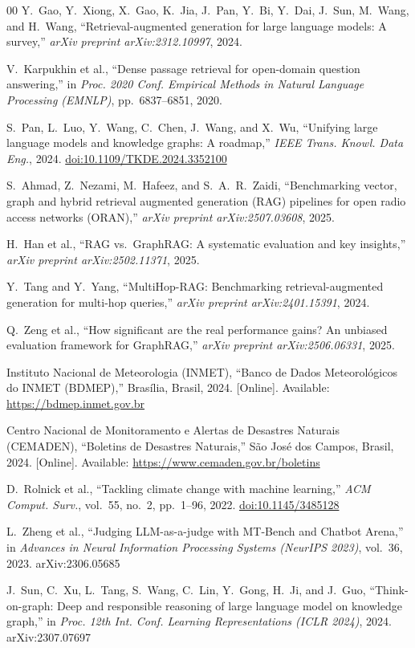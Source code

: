 \documentclass[conference]{IEEEtran}
\begin{document}
\begin{thebibliography}{00}
Y.~Gao, Y.~Xiong, X.~Gao, K.~Jia, J.~Pan, Y.~Bi, Y.~Dai,
J.~Sun, M.~Wang, and H.~Wang,
``Retrieval-augmented generation for large language models:
A survey,''
\textit{arXiv preprint arXiv:2312.10997}, 2024.

V.~Karpukhin et al.,
``Dense passage retrieval for open-domain question answering,''
in \textit{Proc. 2020 Conf. Empirical Methods in Natural Language
Processing (EMNLP)}, pp.~6837--6851, 2020.

S.~Pan, L.~Luo, Y.~Wang, C.~Chen, J.~Wang, and X.~Wu,
``Unifying large language models and knowledge graphs: A roadmap,''
\textit{IEEE Trans. Knowl. Data Eng.}, 2024.
\href{https://doi.org/10.1109/TKDE.2024.3352100}{doi:10.1109/TKDE.2024.3352100}

S.~Ahmad, Z.~Nezami, M.~Hafeez, and S.~A.~R.~Zaidi,
``Benchmarking vector, graph and hybrid retrieval augmented
generation (RAG) pipelines for open radio access networks (ORAN),''
\textit{arXiv preprint arXiv:2507.03608}, 2025.

H.~Han et al.,
``RAG vs.\ GraphRAG: A systematic evaluation and key insights,''
\textit{arXiv preprint arXiv:2502.11371}, 2025.

Y.~Tang and Y.~Yang,
``MultiHop-RAG: Benchmarking retrieval-augmented generation for
multi-hop queries,''
\textit{arXiv preprint arXiv:2401.15391}, 2024.

Q.~Zeng et al.,
``How significant are the real performance gains? An unbiased
evaluation framework for GraphRAG,''
\textit{arXiv preprint arXiv:2506.06331}, 2025.

Instituto Nacional de Meteorologia (INMET),
``Banco de Dados Meteorológicos do INMET (BDMEP),''
Brasília, Brasil, 2024.
[Online]. Available: \url{https://bdmep.inmet.gov.br}

Centro Nacional de Monitoramento e Alertas de Desastres Naturais
(CEMADEN),
``Boletins de Desastres Naturais,''
São José dos Campos, Brasil, 2024.
[Online]. Available: \url{https://www.cemaden.gov.br/boletins}

D.~Rolnick et al.,
``Tackling climate change with machine learning,''
\textit{ACM Comput. Surv.}, vol.~55, no.~2, pp.~1--96, 2022.
\href{https://doi.org/10.1145/3485128}{doi:10.1145/3485128}

L.~Zheng et al.,
``Judging LLM-as-a-judge with MT-Bench and Chatbot Arena,''
in \textit{Advances in Neural Information Processing Systems
(NeurIPS 2023)}, vol.~36, 2023.
arXiv:2306.05685

J.~Sun, C.~Xu, L.~Tang, S.~Wang, C.~Lin, Y.~Gong, H.~Ji,
and J.~Guo,
``Think-on-graph: Deep and responsible reasoning of large
language model on knowledge graph,''
in \textit{Proc. 12th Int. Conf. Learning Representations
(ICLR 2024)}, 2024.
arXiv:2307.07697

\end{thebibliography}
\end{document}
